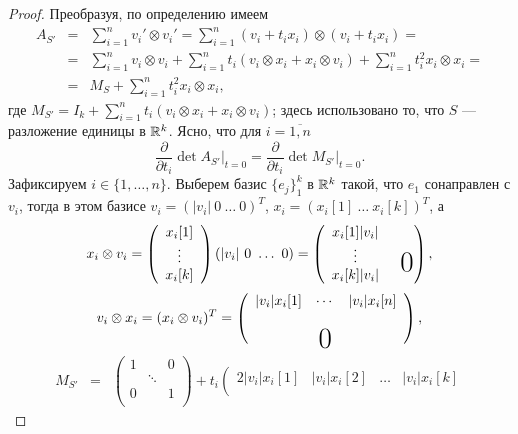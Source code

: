 \documentclass[a4paper,12pt]{article}
\newcommand{\bigzero}{\makebox(0,0){\text{\huge0}}}
\numberwithin{equation}{section}
\begin{document}
	\begin{proof}
		Преобразуя, по определению имеем
			\begin{eqnarray*}
				A_{S'}&=&\sum_{i=1}^n v_i'\otimes v_i'=\sum_{i=1}^n (v_i+t_ix_i)\otimes(v_i+t_ix_i)=\\
					&=&\sum_{i=1}^n v_i\otimes v_i+\sum_{i=1}^n t_i(v_i\otimes x_i+x_i\otimes v_i)+\sum_{i=1}^n t_i^2x_i\otimes x_i=\\
					&=&M_S+\sum_{i=1}^n t_i^2x_i\otimes x_i,
			\end{eqnarray*}
		где $M_{S'}=I_k+\displaystyle\sum_{i=1}^n t_i(v_i\otimes x_i+x_i\otimes v_i)$; здесь использовано то, что $S$ --- разложение единицы в $\mathbb {R}^k$. Ясно, что для $i=\overline{1,n}$
			$$\frac{\partial}{\partial t_i}\det A_{S'}\big|_{t=0}=\frac{\partial}{\partial t_i}\det M_{S'}\big|_{t=0}.$$
		Зафиксируем $i\in\{1,\ldots,n\}$. Выберем базис $\{e_j\}_1^k$ в $\mathbb {R}^k$ такой, что $e_1$ сонаправлен с $v_i$, тогда в этом базисе $v_i=(|v_i|~0~\ldots~0)^T$, $x_i=(x_i[1]~\ldots~x_i[k])^T$, а
			$$x_i\otimes v_i=\left(\begin{array}{c}
								x_i[1]\\
								\vdots\\
								x_i[k]\\
								\end{array}\right)(|v_i|~0~\ldots~0)=
								\left(
								\begin{array}{ccc}
								x_i[1]|v_i| & & \\
								\vdots	& & \bigzero \\
								x_i[k]|v_i| & & \\
								\end{array}\right),
			$$
			$$v_i\otimes x_i=(x_i\otimes v_i)^T=\left(\begin{array}{ccc}
								|v_i|x_i[1] & \cdots & |v_i|x_i[n] \\
								 & & \\
								 & \bigzero &
							\end{array}\right),
			$$
			\begin{eqnarray*}
				M_{S'}&=&\left(\begin{array}{ccc}
								1 & & 0 \\
								 & \ddots &  \\
								0 & & 1\\
								\end{array}\right)+
								t_i\left(\begin{array}{cccc}
								2|v_i|x_i[1] & |v_i|x_i[2] & \ldots & |v_i|x_i[k] \\

\end{array}
\end{eqnarray*}
\end{proof}
\end{document}
